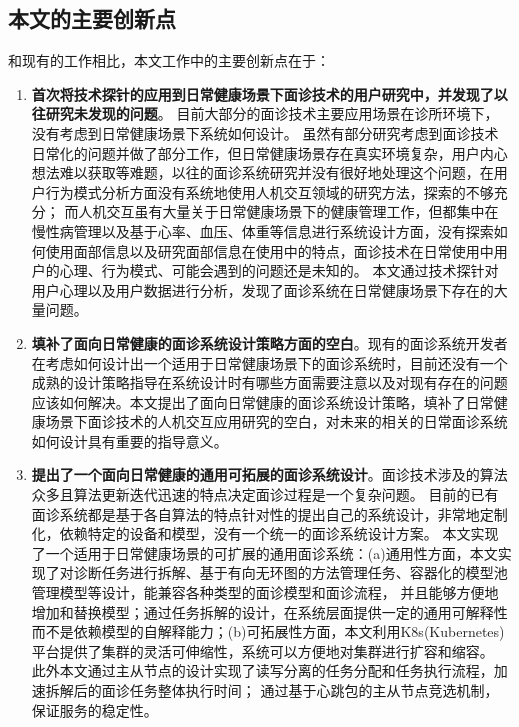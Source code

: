\subsection{本文的主要创新点}
和现有的工作相比，本文工作中的主要创新点在于：
\begin{enumerate}
    \item \textbf{首次将技术探针的应用到日常健康场景下面诊技术的用户研究中，并发现了以往研究未发现的问题}。
    目前大部分的面诊技术主要应用场景在诊所环境下，没有考虑到日常健康场景下系统如何设计。
虽然有部分研究考虑到面诊技术日常化的问题并做了部分工作，但日常健康场景存在真实环境复杂，用户内心想法难以获取等难题，以往的面诊系统研究并没有很好地处理这个问题，在用户行为模式分析方面没有系统地使用人机交互领域的研究方法，探索的不够充分；
而人机交互虽有大量关于日常健康场景下的健康管理工作，但都集中在慢性病管理以及基于心率、血压、体重等信息进行系统设计方面，没有探索如何使用面部信息以及研究面部信息在使用中的特点，面诊技术在日常使用中用户的心理、行为模式、可能会遇到的问题还是未知的。
本文通过技术探针对用户心理以及用户数据进行分析，发现了面诊系统在日常健康场景下存在的大量问题。

\item \textbf{填补了面向日常健康的面诊系统设计策略方面的空白}。现有的面诊系统开发者在考虑如何设计出一个适用于日常健康场景下的面诊系统时，目前还没有一个成熟的设计策略指导在系统设计时有哪些方面需要注意以及对现有存在的问题应该如何解决。本文提出了面向日常健康的面诊系统设计策略，填补了日常健康场景下面诊技术的人机交互应用研究的空白\cite{ding2019reading}，对未来的相关的日常面诊系统如何设计具有重要的指导意义。 

\item \textbf{提出了一个面向日常健康的通用可拓展的面诊系统设计}。面诊技术涉及的算法众多且算法更新迭代迅速的特点决定面诊过程是一个复杂问题。
    目前的已有面诊系统都是基于各自算法的特点针对性的提出自己的系统设计，非常地定制化，依赖特定的设备和模型，没有一个统一的面诊系统设计方案。
    本文实现了一个适用于日常健康场景的可扩展的通用面诊系统：(a)通用性方面，本文实现了对诊断任务进行拆解、基于有向无环图的方法管理任务、容器化的模型池管理模型等设计，能兼容各种类型的面诊模型和面诊流程，
            并且能够方便地增加和替换模型；通过任务拆解的设计，在系统层面提供一定的通用可解释性而不是依赖模型的自解释能力；(b)可拓展性方面，本文利用K8s(Kubernetes)平台提供了集群的灵活可伸缩性，系统可以方便地对集群进行扩容和缩容。
            此外本文通过主从节点的设计实现了读写分离的任务分配和任务执行流程，加速拆解后的面诊任务整体执行时间；
            通过基于心跳包的主从节点竞选机制，保证服务的稳定性。
\end{enumerate}

